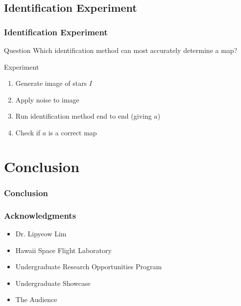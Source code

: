 \documentclass[11pt]{beamer}
\begin{document}
    \subsection{Identification Experiment}\label{subsec:identificationExperiment}
    \begin{frame}
        \frametitle{Identification Experiment}
        \begin{block}{Question}
            Which identification method can most accurately determine a map?
        \end{block} \bigskip
        \begin{block}{Experiment}
            \begin{enumerate}
                \item Generate image of stars $I$
                \item Apply noise to image
                \item Run identification method end to end (giving $a$)
                \item Check if $a$ is a correct map
            \end{enumerate}
        \end{block}
    \end{frame}

    \section{Conclusion}\label{sec:conclusion}
    \begin{frame}
        \frametitle{Conclusion}
    \end{frame}

    \begin{frame}
        \frametitle{Acknowledgments}
        \begin{itemize}
            \item Dr. Lipyeow Lim \medskip
            \item Hawaii Space Flight Laboratory \medskip
            \item Undergraduate Research Opportunities Program \medskip
            \item Undergraduate Showcase \medskip
            \item The Audience \medskip
        \end{itemize}
    \end{frame}

    \begin{frame}
    \end{frame}
\end{document}
